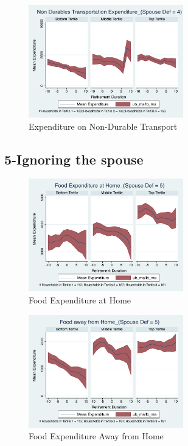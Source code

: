 \documentclass[11pt,onecolumn]{article}
\begin{document}
\begin{figure}[h]
	\caption{Expenditure on Non-Durable Transport}
	\centering
	\includegraphics[width=0.6\textwidth]{../ConsumptionPostRetirement_by_SpouseDef_Cats/Smoothed/4/spouse_def_total_transport_real.pdf}
\end{figure}
\clearpage

\subsection{5-Ignoring the spouse}

\begin{figure}[h]
	\caption{Food Expenditure at Home}
	\centering
	\includegraphics[width=0.6\textwidth]{../ConsumptionPostRetirement_by_SpouseDef_Cats/Smoothed/5/spouse_def_total_foodexp_home_real.pdf}
\end{figure}


\begin{figure}[h]
	\caption{Food Expenditure Away from Home}
	\centering
	\includegraphics[width=0.6\textwidth]{../ConsumptionPostRetirement_by_SpouseDef_Cats/Smoothed/5/spouse_def_total_foodexp_away_real.pdf}
\end{figure}
\end{document}

